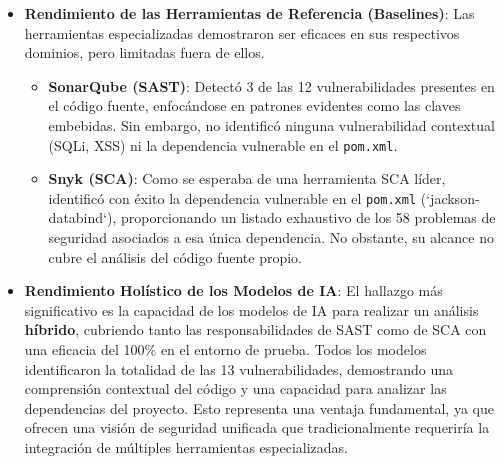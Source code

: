 \begin{itemize}
    \item \textbf{Rendimiento de las Herramientas de Referencia (Baselines)}: Las herramientas especializadas demostraron ser eficaces en sus respectivos dominios, pero limitadas fuera de ellos.
        \begin{itemize}
            \item \textbf{SonarQube (SAST)}: Detectó 3 de las 12 vulnerabilidades presentes en el código fuente, enfocándose en patrones evidentes como las claves embebidas. Sin embargo, no identificó ninguna vulnerabilidad contextual (SQLi, XSS) ni la dependencia vulnerable en el \texttt{pom.xml}.
            \item \textbf{Snyk (SCA)}: Como se esperaba de una herramienta SCA líder, identificó con éxito la dependencia vulnerable en el \texttt{pom.xml} (`jackson-databind`), proporcionando un listado exhaustivo de los 58 problemas de seguridad asociados a esa única dependencia. No obstante, su alcance no cubre el análisis del código fuente propio.
        \end{itemize}

    \item \textbf{Rendimiento Holístico de los Modelos de IA}: El hallazgo más significativo es la capacidad de los modelos de IA para realizar un análisis \textbf{híbrido}, cubriendo tanto las responsabilidades de SAST como de SCA con una eficacia del 100\% en el entorno de prueba. Todos los modelos identificaron la totalidad de las 13 vulnerabilidades, demostrando una comprensión contextual del código y una capacidad para analizar las dependencias del proyecto. Esto representa una ventaja fundamental, ya que ofrecen una visión de seguridad unificada que tradicionalmente requeriría la integración de múltiples herramientas especializadas.


\end{itemize}
